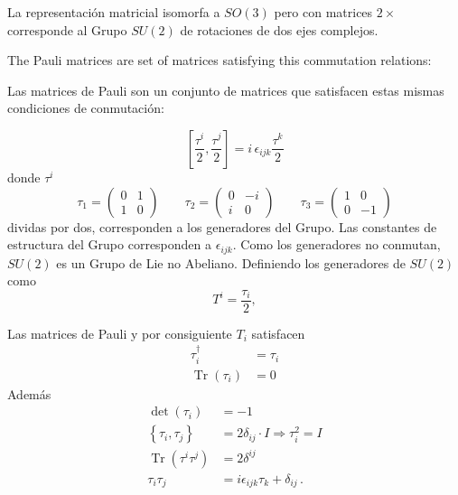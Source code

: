 La representación matricial isomorfa a $SO(3)$ pero con matrices $2\times$ corresponde al Grupo $SU(2)$ de rotaciones de dos ejes complejos.
\begin{english}
  The Pauli matrices are set of matrices satisfying this commutation relations:
\end{english}
\begin{spanish}
Las matrices de Pauli son un conjunto de matrices que satisfacen estas mismas condiciones de conmutación: 
\end{spanish}
\begin{equation}
  \label{eq:paulialg}
  \left[\frac{\tau^i}{2},\frac{\tau^j}{2} \right]=i\,\epsilon_{ijk}\frac{\tau^k}{2}
\end{equation}
donde $\tau^i$ 
\begin{equation}
  \label{eq:paulimatr}
  \tau_1=
  \begin{pmatrix}
    0&1\\
    1&0
  \end{pmatrix} \qquad
 \tau_2=
  \begin{pmatrix}
    0&-i\\
    i&0
  \end{pmatrix}\qquad 
 \tau_3=
  \begin{pmatrix}
    1&0\\
    0&-1
  \end{pmatrix}
 \end{equation}
dividas por dos, corresponden a los generadores del Grupo. Las constantes de estructura del Grupo corresponden a $\epsilon_{ijk}$. Como los generadores no conmutan, $SU(2)$ es un Grupo de Lie no Abeliano. Definiendo los generadores de $SU(2)$ como
\begin{equation}
  T^i=\frac{\tau_i}{2},
\end{equation}

Las matrices de Pauli y por consiguiente $T_i$ satisfacen 
\begin{align}
  \tau_i^\dagger&=\tau_i\nonumber\\
  \operatorname{Tr}  \left(
    \tau_i
  \right)&=0
\end{align}
Además
\begin{align}
  \label{eq:64qft}
  \det
  \left(
    \tau_i
  \right)&=-1\nonumber\\
  \left\{ 
    \tau_i,\tau_j
  \right\}&=2\delta_{ij}\cdot I\Rightarrow\tau_i^2=I\nonumber \\
\operatorname{Tr} \left(\tau^i\tau^j\right)&=2\delta^{ij}\nonumber\\
\tau_i\tau_j&=i\epsilon_{ijk}\tau_k+\delta_{ij}\,.
\end{align}


